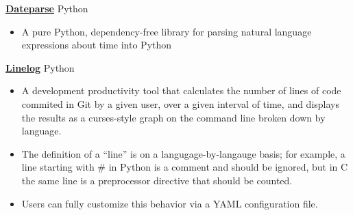 \documentclass[11pt]{article}
\newcommand{\project}[2]{
    \begingroup
        \textbf{\small#1}
        \hfill\color{black!70}\small{#2}
    \endgroup
}
\newcommand{\spacevv}{
    \vspace{2mm}
}
\begin{document}
\begin{paracol}{2}
{        \spacevv
        \iffalse
        \project{\href{example.com}{Quackbot}}{Javascript, Typescript}
        \begin{itemize}
            \item A discord bot with a large variety of features 
        \end{itemize}
        \spacevv
        \fi

        \project{\href{https://github.com/keagud/dateparse}{Dateparse}}{Python}
        \begin{itemize}

          \item A pure Python, dependency-free library for parsing natural language expressions about time into Python
        \end{itemize}
        \spacevv

        \project{\href{https://github.com/keagud/linelog}{Linelog}}{Python}
        \begin{itemize}
          \item A development productivity tool that calculates the number of lines of code commited in Git by a given user, over a given interval of time, and displays the results as a curses-style graph on the command line broken down by language.
          \item The definition of a ``line'' is on a langugage-by-langauge basis;  for example, a line starting with \# in Python is a comment and should be ignored, but in C the same line is a preprocessor directive that should be counted. 
          \item Users can fully customize this behavior via a YAML configuration file. 
        \end{itemize}
        \spacevv

      \iffalse
        \project{\href{https://github.com/keagud/verba}{Verba Whitakari}}{C++, Python, CMake}
        \begin{itemize}
          \item A complete port of the classic Latin morphological analysis and dictionary tool \href{https://en.wikipedia.org/wiki/William\_Whitaker\%27s\_Words>}{William Whitaker's Words}, translated and refactored from the original 1993 Ada program into modern C++. This project aims to maintain the functionality of the original in a form that can be better preserved into the future (Ada build systems are not trivial to work with in \$CURRENT\_YEAR) while improving performance and ease of use. 
        \end{itemize}    
        \fi
}
    \end{paracol}
\end{document}
